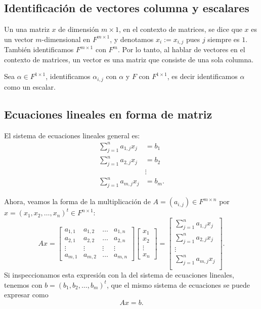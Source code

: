 \documentclass{article}
\begin{document}
\subsection{Identificación de vectores columna y escalares}
Un una matriz $x$ de dimensión $m\times 1$, en el contexto de matrices, se dice que $x$ es un vector $m$-dimensional en $F^{m\times 1}$, y denotamos $x_i := x_{i,j}$
pues $j$ siempre es $1$. También identificamos
$F^{m\times 1}$ con ${F}^m$. Por lo tanto,
al hablar de vectores en el contexto de matrices, un vector
es una matriz que consiste de una sola columna.

Sea $\alpha\in F^{1\times 1}$, identificamos $\alpha_{i,j}$ con
$\alpha$ y $F$ con $F^{1\times 1}$, es decir identificamos $\alpha$
como un escalar.

\subsection{Ecuaciones lineales en forma de matriz}
El sistema de ecuaciones lineales general es:
\begin{align*}
    \sum^n_{j=1}a_{1,j} x_j &= b_1 \\
    \sum^n_{j=1}a_{2,j} x_j &= b_2 \\
    &\vdots \\
    \sum^n_{j=1}a_{m,j} x_j &= b_m.
\end{align*}

Ahora, veamos la forma de la multiplicación de
$A=(a_{i,j})\in F^{m\times n}$
por $x=(x_1, x_2, \ldots, x_n)^t \in F^{n\times 1}$:
$$Ax = 
\begin{bmatrix}
    a_{1,1} & a_{1,2} & \ldots & a_{1, n} \\
    a_{2,1} & a_{2,2} & \ldots & a_{2, n} \\
    \vdots & \vdots & \vdots & \vdots \\
    a_{m,1} & a_{m,2} & \ldots & a_{m, n}
\end{bmatrix}
\begin{bmatrix}
    x_1 \\
    x_2 \\
    \vdots \\
    x_n
\end{bmatrix}
=
\begin{bmatrix}
    \sum^n_{j=1} a_{1,j} x_j \\ 
    \sum^n_{j=1} a_{2,j} x_j \\
    \vdots \\
    \sum^n_{j=1} a_{m,j} x_j \\ 
\end{bmatrix}.$$
Si inspeccionamos esta expresión con la del sistema de ecuaciones lineales, tenemos con $b=(b_1, b_2, \ldots, b_m)^t$, que el mismo sistema de ecuaciones se puede expresar como
$$Ax = b.$$
\end{document}
